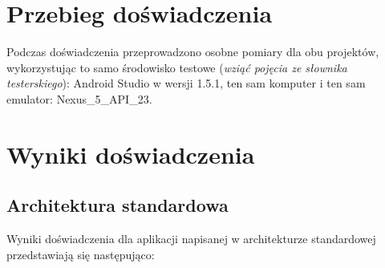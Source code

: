 \section{Przebieg doświadczenia}
Podczas doświadczenia przeprowadzono osobne pomiary dla obu projektów, wykorzystując to samo środowisko testowe (\textit{wziąć pojęcia ze słownika testerskiego}): Android Studio w wersji 1.5.1, ten sam komputer i ten sam emulator: Nexus\_5\_API\_23.

\section{Wyniki doświadczenia}
\label{wyniki_doswiadczenia}
\subsection{Architektura standardowa}
Wyniki doświadczenia dla aplikacji napisanej w architekturze standardowej przedstawiają się następująco:

